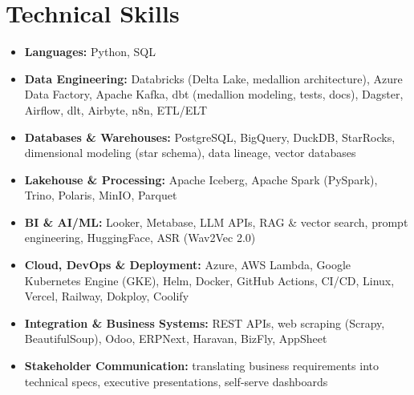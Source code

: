 
\section{Technical Skills}
\begin{itemize}[leftmargin=30pt, label=\textbullet, itemsep=1pt]
  \item \textbf{Languages:} Python, SQL
  \item \textbf{Data Engineering:} Databricks (Delta Lake, medallion architecture), Azure Data Factory, Apache Kafka, dbt (medallion modeling, tests, docs), Dagster, Airflow, dlt, Airbyte, n8n, ETL/ELT
  \item \textbf{Databases \& Warehouses:} PostgreSQL, BigQuery, DuckDB, StarRocks, dimensional modeling (star schema), data lineage, vector databases
  \item \textbf{Lakehouse \& Processing:} Apache Iceberg, Apache Spark (PySpark), Trino, Polaris, MinIO, Parquet
  \item \textbf{BI \& AI/ML:} Looker, Metabase, LLM APIs, RAG \& vector search, prompt engineering, HuggingFace, ASR (Wav2Vec 2.0)
  \item \textbf{Cloud, DevOps \& Deployment:} Azure, AWS Lambda, Google Kubernetes Engine (GKE), Helm, Docker, GitHub Actions, CI/CD, Linux, Vercel, Railway, Dokploy, Coolify
  \item \textbf{Integration \& Business Systems:} REST APIs, web scraping (Scrapy, BeautifulSoup), Odoo, ERPNext, Haravan, BizFly, AppSheet
  \item \textbf{Stakeholder Communication:} translating business requirements into technical specs, executive presentations, self-serve dashboards
\end{itemize}
